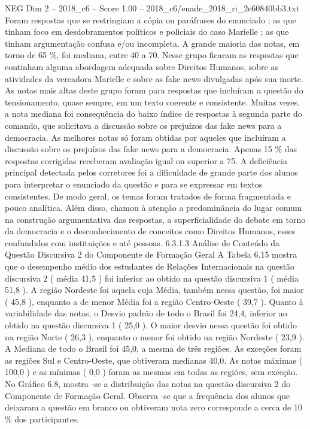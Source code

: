 \begin{textsample}{NEG Dim 2 – 2018\_c6 – Score 1.00 – 2018\_c6/enade\_2018\_ri\_2e60840bb3.txt}
Foram respostas que se restringiam a cópia ou paráfrases do enunciado ; as que tinham foco em desdobramentos políticos e policiais do caso Marielle ; as que tinham argumentação confusa e/ou incompleta.
A grande maioria das notas, em torno de 65 \%, foi mediana, entre 40 a 70.
Nesse grupo ficaram as respostas que continham alguma abordagem adequada sobre Direitos Humanos, sobre as atividades da vereadora Marielle e sobre as fake news divulgadas após sua morte.
As notas mais altas deste grupo foram para respostas que incluíram a questão do tensionamento, quase sempre, em um texto coerente e consistente.
Muitas vezes, a nota mediana foi consequência do baixo índice de respostas à segunda parte do comando, que solicitava a discussão sobre os prejuízos das fake news para a democracia.
As melhores notas só foram obtidas por aqueles que incluíram a discussão sobre os prejuízos das fake news para a democracia.
Apenas 15 \% das respostas corrigidas receberam avaliação igual ou superior a 75.
A deficiência principal detectada pelos corretores foi a dificuldade de grande parte dos alunos para interpretar o enunciado da questão e para se expressar em textos consistentes.
De modo geral, os temas foram tratados de forma fragmentada e pouco analítica.
Além disso, chamou à atenção a predominância do lugar comum na construção argumentativa das respostas, a superficialidade do debate em torno da democracia e o desconhecimento de conceitos como Direitos Humanos, esses confundidos com instituições e até pessoas. 6.3.1.3 Análise de Conteúdo da Questão Discursiva 2 do Componente de Formação Geral A Tabela 6.15 mostra que o desempenho médio dos estudantes de Relações Internacionais na questão discursiva 2 ( média 41,5 ) foi inferior ao obtido na questão discursiva 1 ( média 51,8 ).
A região Nordeste foi aquela cuja Média, também nessa questão, foi maior ( 45,8 ), enquanto a de menor Média foi a região Centro-Oeste ( 39,7 ).
Quanto à variabilidade das notas, o Desvio padrão de todo o Brasil foi 24,4, inferior ao obtido na questão discursiva 1 ( 25,0 ).
O maior desvio nessa questão foi obtido na região Norte ( 26,3 ), enquanto o menor foi obtido na região Nordeste ( 23,9 ).
A Mediana de todo o Brasil foi 45,0, a mesma de três regiões.
As exceções foram as regiões Sul e Centro-Oeste, que obtiveram medianas 40,0.
As notas máximas ( 100,0 ) e as mínimas ( 0,0 ) foram as mesmas em todas as regiões, sem exceção.
No Gráfico 6.8, mostra -se a distribuição das notas na questão discursiva 2 do Componente de Formação Geral.
Observa -se que a frequência dos alunos que deixaram a questão em branco ou obtiveram nota zero corresponde a cerca de 10 \% dos participantes.

\end{textsample}
